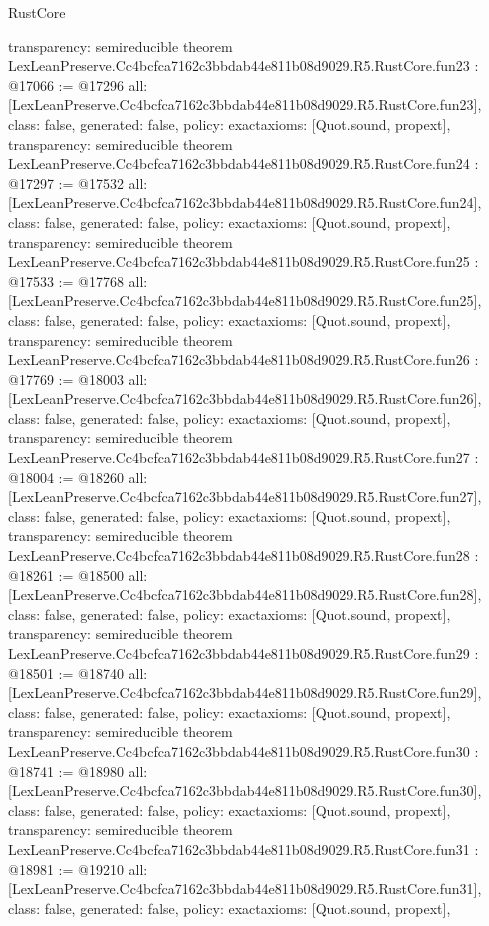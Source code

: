 \begin{lexlean}{RustCore}
\begin{coremodule}
{  transparency: semireducible
}
theorem LexLeanPreserve.Cc4bcfca7162c3bbdab44e811b08d9029.R5.RustCore.fun23 : @17066 := @17296 {
  all: [LexLeanPreserve.Cc4bcfca7162c3bbdab44e811b08d9029.R5.RustCore.fun23],
  class: false,
  generated: false,
  policy: exact{axioms: [Quot.sound, propext]},
  transparency: semireducible
}
theorem LexLeanPreserve.Cc4bcfca7162c3bbdab44e811b08d9029.R5.RustCore.fun24 : @17297 := @17532 {
  all: [LexLeanPreserve.Cc4bcfca7162c3bbdab44e811b08d9029.R5.RustCore.fun24],
  class: false,
  generated: false,
  policy: exact{axioms: [Quot.sound, propext]},
  transparency: semireducible
}
theorem LexLeanPreserve.Cc4bcfca7162c3bbdab44e811b08d9029.R5.RustCore.fun25 : @17533 := @17768 {
  all: [LexLeanPreserve.Cc4bcfca7162c3bbdab44e811b08d9029.R5.RustCore.fun25],
  class: false,
  generated: false,
  policy: exact{axioms: [Quot.sound, propext]},
  transparency: semireducible
}
theorem LexLeanPreserve.Cc4bcfca7162c3bbdab44e811b08d9029.R5.RustCore.fun26 : @17769 := @18003 {
  all: [LexLeanPreserve.Cc4bcfca7162c3bbdab44e811b08d9029.R5.RustCore.fun26],
  class: false,
  generated: false,
  policy: exact{axioms: [Quot.sound, propext]},
  transparency: semireducible
}
theorem LexLeanPreserve.Cc4bcfca7162c3bbdab44e811b08d9029.R5.RustCore.fun27 : @18004 := @18260 {
  all: [LexLeanPreserve.Cc4bcfca7162c3bbdab44e811b08d9029.R5.RustCore.fun27],
  class: false,
  generated: false,
  policy: exact{axioms: [Quot.sound, propext]},
  transparency: semireducible
}
theorem LexLeanPreserve.Cc4bcfca7162c3bbdab44e811b08d9029.R5.RustCore.fun28 : @18261 := @18500 {
  all: [LexLeanPreserve.Cc4bcfca7162c3bbdab44e811b08d9029.R5.RustCore.fun28],
  class: false,
  generated: false,
  policy: exact{axioms: [Quot.sound, propext]},
  transparency: semireducible
}
theorem LexLeanPreserve.Cc4bcfca7162c3bbdab44e811b08d9029.R5.RustCore.fun29 : @18501 := @18740 {
  all: [LexLeanPreserve.Cc4bcfca7162c3bbdab44e811b08d9029.R5.RustCore.fun29],
  class: false,
  generated: false,
  policy: exact{axioms: [Quot.sound, propext]},
  transparency: semireducible
}
theorem LexLeanPreserve.Cc4bcfca7162c3bbdab44e811b08d9029.R5.RustCore.fun30 : @18741 := @18980 {
  all: [LexLeanPreserve.Cc4bcfca7162c3bbdab44e811b08d9029.R5.RustCore.fun30],
  class: false,
  generated: false,
  policy: exact{axioms: [Quot.sound, propext]},
  transparency: semireducible
}
theorem LexLeanPreserve.Cc4bcfca7162c3bbdab44e811b08d9029.R5.RustCore.fun31 : @18981 := @19210 {
  all: [LexLeanPreserve.Cc4bcfca7162c3bbdab44e811b08d9029.R5.RustCore.fun31],
  class: false,
  generated: false,
  policy: exact{axioms: [Quot.sound, propext]},
}
\end{coremodule}
\end{lexlean}
